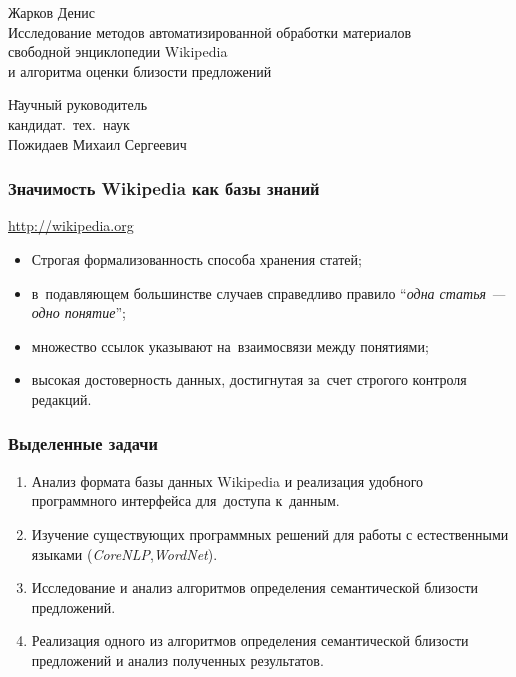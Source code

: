 \documentclass{beamer}
\begin{document}
\sloppy

\begin{frame}
\begin{center}
Жарков Денис\\
\vspace{1cm}
{\Large Исследование методов автоматизированной обработки материалов \\ 
свободной энциклопедии Wikipedia\\
и алгоритма оценки близости предложений}
\end{center}
\begin{tabbing}
\hspace{6.5cm} \= Научный руководитель\\
\> кандидат.~тех.~наук\\
\> Пожидаев Михаил Сергеевич\\
\end{tabbing}
\end{frame}

\begin{frame}
\frametitle{Значимость Wikipedia как базы знаний}

\url{http://wikipedia.org}

\begin{itemize}
\item{
Строгая формализованность способа хранения статей;
}
\item{
в~подавляющем большинстве случаев справедливо
правило ``\textit{одна статья --- одно понятие}'';
}
\item{
множество ссылок указывают на~взаимосвязи между понятиями;
}
\item{
высокая достоверность данных, достигнутая за~счет строгого контроля редакций.
}
\end{itemize}
\end{frame}

\begin{frame}
\frametitle{Выделенные задачи}
\begin{enumerate}
\item {
Анализ формата базы данных Wikipedia и реализация удобного программного интерфейса 
для~доступа к~данным.
}
\item {
Изучение существующих программных решений для работы с естественными языками (\textit{CoreNLP},\textit{WordNet}).
}
\item {
Исследование и анализ алгоритмов определения семантической близости предложений.
}
\item{
Реализация одного из алгоритмов определения семантической близости предложений и
анализ полученных результатов.
}
\end{enumerate}
\end{frame}
\end{document}
